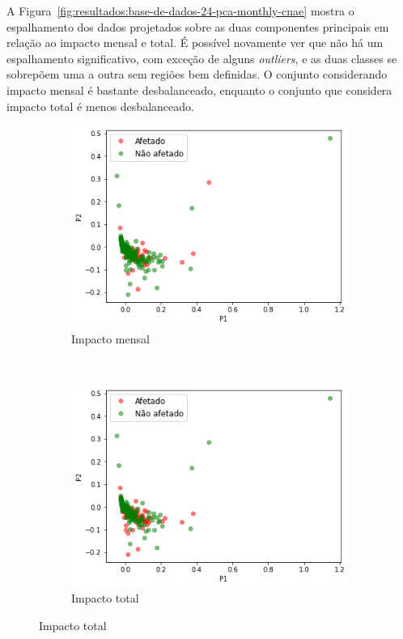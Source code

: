 A Figura~\ref{fig:resultados:base-de-dados-24-pca-monthly-cnae} mostra o espalhamento dos dados projetados sobre as duas componentes principais em relação ao impacto mensal e total. É possível novamente ver que não há um espalhamento significativo, com exceção de alguns \textit{outliers}, e as duas classes se sobrepõem uma a outra sem regiões bem definidas. O conjunto considerando impacto mensal é bastante desbalanceado, enquanto o conjunto que considera impacto total é menos desbalanceado.

\begin{figure}[htb] 
    \centering 
    \caption{Visualização dos dados de CNAEs projetados sobre as duas componentes principais}
    \label{fig:resultados:pca-cnae}
    \begin{subfigure}[b]{0.45\textwidth}
        \includegraphics[scale=0.45]{images/base-de-dados-28.2-pca-2d-monthly-cnae.png}
        \caption{Impacto mensal}
        \label{fig:resultados:base-de-dados-24.2-pca-2d-monthly-cnae}
    \end{subfigure} ~ \quad
    \begin{subfigure}[b]{0.45\textwidth}
        \includegraphics[scale=0.45]{images/base-de-dados-28.2-pca-2d-total-cnae.png}
        \caption{Impacto total}
        \label{fig:resultados:base-de-dados-25.2-pca-2d-total-cnae}
    \end{subfigure}
    \fdadospesquisa
\end{figure}

